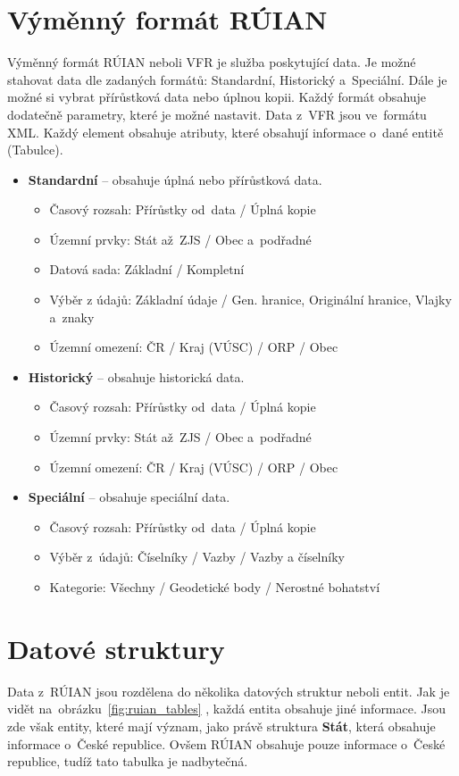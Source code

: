 \documentclass[czech, kiv, ba, he, iso690numb, pdf]{fasthesis}
\begin{document}
\section{Výměnný formát RÚIAN}
Výměnný formát RÚIAN neboli VFR je služba poskytující data.
Je možné stahovat data dle zadaných formátů: Standardní, Historický a~Speciální.
Dále je možné si vybrat přírůstková data nebo úplnou kopii.
Každý formát obsahuje dodatečně parametry, které je možné nastavit.
Data z~VFR jsou ve~formátu XML.
Každý element obsahuje atributy, které obsahují informace o~dané entitě (Tabulce).
\newpage
\begin {itemize}
    \item \textbf{Standardní} -- obsahuje úplná nebo přírůstková data.
    \begin {itemize}
        \item Časový rozsah: Přírůstky od~data / Úplná kopie
        \item Územní prvky: Stát až~ZJS / Obec a~podřadné
        \item Datová sada: Základní / Kompletní
        \item Výběr z údajů: Základní údaje / Gen. hranice, Originální hranice, Vlajky a~znaky
        \item Územní omezení: ČR / Kraj (VÚSC) / ORP / Obec
    \end {itemize}
    \item \textbf{Historický} -- obsahuje historická data.
    \begin {itemize}
        \item Časový rozsah: Přírůstky od~data / Úplná kopie
        \item Územní prvky: Stát až~ZJS / Obec a~podřadné
        \item Územní omezení: ČR / Kraj (VÚSC) / ORP / Obec
    \end {itemize}
    \item \textbf{Speciální} -- obsahuje speciální data.
    \begin {itemize}
        \item Časový rozsah: Přírůstky od~data / Úplná kopie
        \item Výběr z~údajů: Číselníky / Vazby / Vazby a číselníky
        \item Kategorie: Všechny / Geodetické body / Nerostné bohatství
    \end {itemize}
\end {itemize}

\section{Datové struktury}
Data z~RÚIAN jsou rozdělena do několika datových struktur neboli entit.
Jak je vidět na~obrázku~\ref{fig:ruian_tables} \cite{ruian_vfr}, každá entita obsahuje jiné informace.
Jsou zde však entity, které mají význam, jako právě struktura \textbf{Stát}, která obsahuje informace o~České republice.
Ovšem RÚIAN obsahuje pouze informace o~České republice, tudíž tato tabulka je nadbytečná.
\newpage
\end{document}
